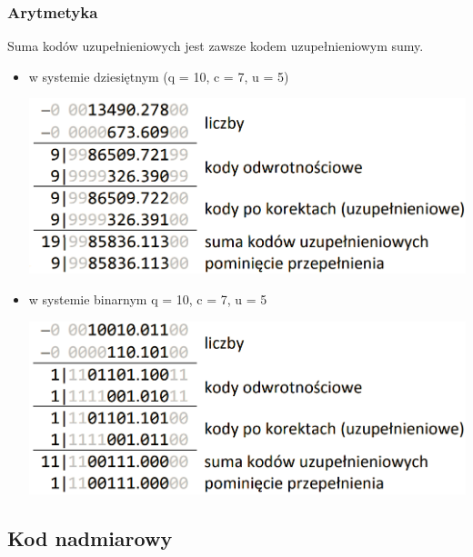 \documentclass[12pt]{article}
\begin{document}
    \subsubsection{Arytmetyka}
        Suma kodów uzupełnieniowych jest zawsze kodem uzupełnieniowym sumy.
        \begin{itemize}
            \item w systemie dziesiętnym  (q = 10, c = 7, u = 5)
            \begin{center}
                \includegraphics[scale=0.4]{graphics/number-repr/uzp-add-dec.png}
            \end{center}
            
            \item w systemie binarnym q = 10, c = 7, u = 5
            \begin{center}
                \includegraphics[scale=0.4]{graphics/number-repr/uzp-add-bin.png}
            \end{center}
        \end{itemize}
        
    \subsection{Kod nadmiarowy}
\end{document}
